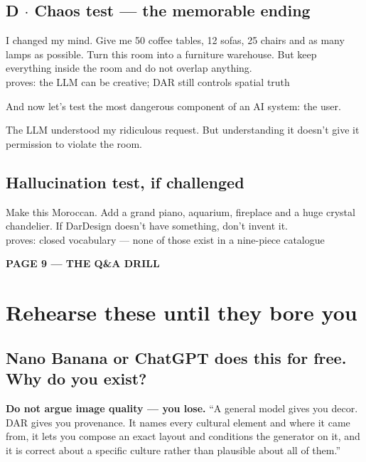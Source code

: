 \documentclass[10.5pt,a4paper]{article}
\newcommand{\pagelabel}[2]{%
  {\sffamily\bfseries\scriptsize\color{brass}\MakeUppercase{Page #1 --- #2}}\par\vspace{0.2em}}
\newcommand{\tests}[1]{{\footnotesize\ttfamily\color{muted}#1}}
\begin{document}
\subsection*{D $\cdot$ Chaos test --- the memorable ending}
\begin{prompt}
I changed my mind. Give me 50 coffee tables, 12 sofas, 25 chairs and as many lamps as possible. Turn
this room into a furniture warehouse. But keep everything inside the room and do not overlap
anything.\\[3pt]
\tests{proves: the LLM can be creative; DAR still controls spatial truth}
\end{prompt}
\begin{sayit}[Introduce it]
And now let's test the most dangerous component of an AI system: the user.
\end{sayit}
\begin{sayit}
The LLM understood my ridiculous request. But understanding it doesn't give it permission to violate
the room.
\end{sayit}

\subsection*{Hallucination test, if challenged}
\begin{prompt}
Make this Moroccan. Add a grand piano, aquarium, fireplace and a huge crystal chandelier. If
DarDesign doesn't have something, don't invent it.\\[3pt]
\tests{proves: closed vocabulary --- none of those exist in a nine-piece catalogue}
\end{prompt}

\newpage
\pagelabel{9}{the q\&a drill}
\section*{Rehearse these until they bore you}

\subsection*{Nano Banana or ChatGPT does this for free. Why do you exist?}
\textbf{Do not argue image quality --- you lose.} ``A general model gives you decor. DAR gives you
provenance. It names every cultural element and where it came from, it lets you compose an exact
layout and conditions the generator on it, and it is correct about a specific culture rather than
plausible about all of them.''
\end{document}
